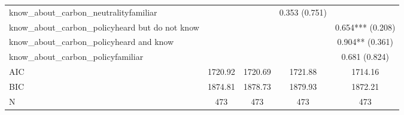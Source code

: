 \begin{table}[!htbp]
\begin{tabular}{lcccc}
know\_about\_carbon\_neutralityfamiliar &  &  & 0.353 (0.751) &  \\
know\_about\_carbon\_policyheard but do not know &  &  &  & 0.654*** (0.208) \\
know\_about\_carbon\_policyheard and know &  &  &  & 0.904** (0.361) \\
know\_about\_carbon\_policyfamiliar &  &  &  & 0.681 (0.824) \\
AIC & 1720.92 & 1720.69 & 1721.88 & 1714.16 \\
BIC & 1874.81 & 1878.73 & 1879.93 & 1872.21 \\
N & 473 & 473 & 473 & 473 \\
\hline
\end{tabular}
\end{table}
